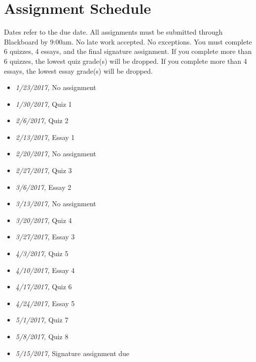 \documentclass[article,oneside]{memoir}
\begin{document}
\section{ Assignment Schedule}
Dates refer to the due date. All assignments must be submitted through Blackboard by 9:00am. No late work accepted. No exceptions. You must complete 6 quizzes, 4 essays, and the final signature assignment.  If you complete more than 6 quizzes, the lowest quiz grade(s) will be dropped. If you complete more than 4 essays, the lowest essay grade(s) will be dropped. 



\begin{itemize}
\item \textit{1/23/2017,} No assignment 
\item \textit{1/30/2017,} Quiz 1
\item \textit{2/6/2017,} Quiz 2
\item \textit{2/13/2017,} Essay 1
\item \textit{2/20/2017,} No assignment
\item \textit{2/27/2017,} Quiz 3
\item \textit{3/6/2017,}  Essay 2
\item \textit{3/13/2017,}  No assignment
\item \textit{3/20/2017,} Quiz 4
\item \textit{3/27/2017,}  Essay 3
\item \textit{4/3/2017,} Quiz 5
\item \textit{4/10/2017,} Essay 4
\item \textit{4/17/2017,} Quiz 6
\item \textit{4/24/2017,} Essay 5
\item \textit{5/1/2017,} Quiz 7
\item \textit{5/8/2017,} Quiz 8
\item \textit{5/15/2017,} Signature assignment due
\end{itemize}



\end{document}
